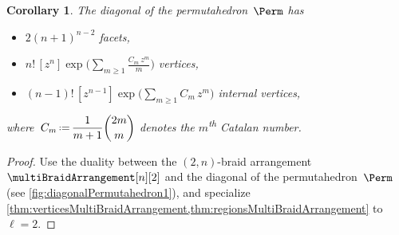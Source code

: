 \documentclass{amsart}
\newtheorem{corollary}[theorem]{Corollary}
\theoremstyle{definition}
\newcommand{\eqdef}{\mbox{\,\raisebox{0.2ex}{\scriptsize\ensuremath{\mathrm:}}\ensuremath{=}\,}} %
\newcommand{\ordinal}{\textsuperscript{th}} %
\begin{document}
\begin{corollary}
\label{coro:enumerationDiagonalPermutahedra}
The diagonal of the permutahedron~$\Perm$ has 
\begin{itemize}
\item $2 (n + 1)^{n-2}$ facets,
\item $\displaystyle n! \, [z^n] \exp \bigg( \sum_{m \ge 1} \frac{C_m \, z^m}{m} \bigg)$ vertices,
\item $\displaystyle (n-1)! \, [z^{n-1}] \exp \bigg( \sum_{m \ge 1} C_m \, z^m \bigg)$ internal vertices,
\end{itemize}
where~$\displaystyle C_m \eqdef \frac{1}{m+1} \binom{2m}{m}$ denotes the $m$\ordinal{} Catalan number.
\end{corollary}

\begin{proof}
Use the duality between the $(2,n)$-braid arrangement~$\multiBraidArrangement[n][2]$ and the diagonal of the permutahedron~$\Perm$ (see \cref{fig:diagonalPermutahedron1}), and specialize \cref{thm:verticesMultiBraidArrangement,thm:regionsMultiBraidArrangement} to~$\ell = 2$.
\end{proof}
\end{document}
